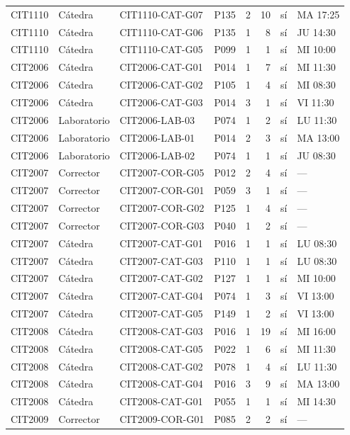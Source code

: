 \begin{longtable}{llllrrcl}
CIT1110 & Cátedra & CIT1110-CAT-G07 & P135 & 2 & 10 & sí & MA 17:25 \\
CIT1110 & Cátedra & CIT1110-CAT-G06 & P135 & 1 & 8 & sí & JU 14:30 \\
CIT1110 & Cátedra & CIT1110-CAT-G05 & P099 & 1 & 1 & sí & MI 10:00 \\
CIT2006 & Cátedra & CIT2006-CAT-G01 & P014 & 1 & 7 & sí & MI 11:30 \\
CIT2006 & Cátedra & CIT2006-CAT-G02 & P105 & 1 & 4 & sí & MI 08:30 \\
CIT2006 & Cátedra & CIT2006-CAT-G03 & P014 & 3 & 1 & sí & VI 11:30 \\
CIT2006 & Laboratorio & CIT2006-LAB-03 & P074 & 1 & 2 & sí & LU 11:30 \\
CIT2006 & Laboratorio & CIT2006-LAB-01 & P014 & 2 & 3 & sí & MA 13:00 \\
CIT2006 & Laboratorio & CIT2006-LAB-02 & P074 & 1 & 1 & sí & JU 08:30 \\
CIT2007 & Corrector & CIT2007-COR-G05 & P012 & 2 & 4 & sí & — \\
CIT2007 & Corrector & CIT2007-COR-G01 & P059 & 3 & 1 & sí & — \\
CIT2007 & Corrector & CIT2007-COR-G02 & P125 & 1 & 4 & sí & — \\
CIT2007 & Corrector & CIT2007-COR-G03 & P040 & 1 & 2 & sí & — \\
CIT2007 & Cátedra & CIT2007-CAT-G01 & P016 & 1 & 1 & sí & LU 08:30 \\
CIT2007 & Cátedra & CIT2007-CAT-G03 & P110 & 1 & 1 & sí & LU 08:30 \\
CIT2007 & Cátedra & CIT2007-CAT-G02 & P127 & 1 & 1 & sí & MI 10:00 \\
CIT2007 & Cátedra & CIT2007-CAT-G04 & P074 & 1 & 3 & sí & VI 13:00 \\
CIT2007 & Cátedra & CIT2007-CAT-G05 & P149 & 1 & 2 & sí & VI 13:00 \\
CIT2008 & Cátedra & CIT2008-CAT-G03 & P016 & 1 & 19 & sí & MI 16:00 \\
CIT2008 & Cátedra & CIT2008-CAT-G05 & P022 & 1 & 6 & sí & MI 11:30 \\
CIT2008 & Cátedra & CIT2008-CAT-G02 & P078 & 1 & 4 & sí & LU 11:30 \\
CIT2008 & Cátedra & CIT2008-CAT-G04 & P016 & 3 & 9 & sí & MA 13:00 \\
CIT2008 & Cátedra & CIT2008-CAT-G01 & P055 & 1 & 1 & sí & MI 14:30 \\
CIT2009 & Corrector & CIT2009-COR-G01 & P085 & 2 & 2 & sí & — \\

\end{longtable}
